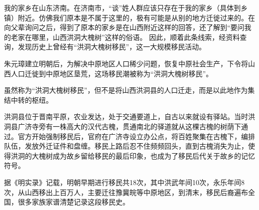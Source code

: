 \documentclass[UTF8,a4paper]{ctexart}
\begin{document}
我的家乡在山东济南。在济南市，“谈”姓人群应该只存在于我的家乡（具体到乡镇）附近。仿佛我们原本是不属于这里的，极有可能是从别的地方迁徙过来的。在向父辈询问之后，得到了原本的家乡是在山西附近这样的回答，还了解到“要问我的老家在哪里，山西洪洞大槐树”这样的俗语。
因此，顺着此条线索，经资料查询，发现历史上曾经有“洪洞大槐树移民”，这一大规模移民活动。
\par
朱元璋建立明朝后，为解决中原地区人口稀少问题，恢复中原社会生产，下令将山西人口迁徙到中原地区垦荒，这场移民潮被称为“洪洞大槐树移民”。

虽然称为“洪洞大槐树移民”，但不是将山西洪洞县的人口迁走，而是以此地作为集结中转的枢纽。

洪洞县位于晋南平原，农业发达，处于交通要道上，自古以来就设有驿站。当时洪洞县广济寺旁有一株高大的汉代古槐，贯通南北的驿道就从这棵古槐的树荫下通过。官方开始强制移民后，官府在广济寺设立办公点，将百姓聚集在古槐下，编排队伍，发放外迁证件和盘缠。移民上路后忍不住频频回头，直到古槐消失为止，使得洪洞的大槐树成为故乡留给移民的最后印象，也成为了移民后代关于故乡的记忆符号。


据《明实录》记载，明朝早期进行移民共18次，其中洪武年间10次，永乐年间8次，从山西移出上百万人，主要迁往豫冀皖等中原地区，到清末，移民后裔遍布全国，很多家族家谱清楚记录这段移民史。 

\clearpage
\end{document}
